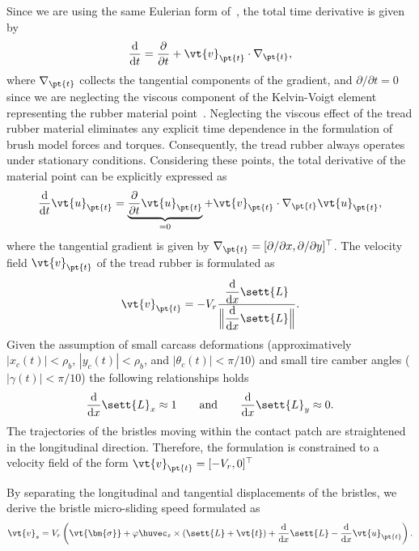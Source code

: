 Since we are using the same Eulerian form of~\cite{romano2022analytical}, the total time derivative is given by
%
\begin{equation}
  \dfrac{\mathrm{d}}{\mathrm{d}t} =  \dfrac{\partial}{\partial t} + \vt{v}_{\pt{t}} \cdot\nabla_{\pt{t}},
\end{equation}
%
where $\nabla_{\pt{t}}$ collects the tangential components of the gradient, and $\partial/\partial t = 0$ since we are neglecting the viscous component of the Kelvin-Voigt element representing the rubber material point~\cite{meyers2008mechanical}. Neglecting the viscous effect of the tread rubber material eliminates any explicit time dependence in the formulation of brush model forces and torques. Consequently, the tread rubber always operates under stationary conditions. Considering these points, the total derivative of the material point can be explicitly expressed as
%
\begin{equation}
  \dfrac{\mathrm{d}}{\mathrm{d}t}\vt{u}_{\pt{t}} = \underbrace{\dfrac{\partial}{\partial t}\vt{u}_{\pt{t}}}_{=0} + \vt{v}_{\pt{t}}\cdot\nabla_{\pt{t}}\vt{u}_{\pt{t}},
\end{equation}
%
where the tangential gradient is given by $\nabla_{\pt{t}} = [\partial/\partial x, \partial/\partial y]^\top$. The velocity field $\vt{v}_{\pt{t}}$ of the tread rubber is formulated as
%
\begin{equation}
  \vt{v}_{\pt{t}} = -V_r \dfrac{\dfrac{\mathrm{d}}{\mathrm{d}x} \sett{L}}{\Big\|\dfrac{\mathrm{d}}{\mathrm{d}x} \sett{L}\Big\|}.
\end{equation}
%
Given the assumption of small carcass deformations (approximatively $|x_c(t)| < \rho_b$, $|y_c(t)| < \rho_b$, and $|\theta_c(t)| < \pi/10$) and small tire camber angles ($|\gamma(t)| < \pi/10$) the following relationships holds~\cite{romano2022advanced}
%
\begin{equation}
  \dfrac{\mathrm{d}}{\mathrm{d}x} \sett{L}_x \approx 1 \qquad \text{and} \qquad \dfrac{\mathrm{d}}{\mathrm{d}x} \sett{L}_y \approx 0.
  \label{chap4:eq:approx}
\end{equation}
%
The trajectories of the bristles moving within the contact patch are straightened in the longitudinal direction. Therefore, the formulation is constrained to a velocity field of the form $\vt{v}_{\pt{t}} = [-V_r, 0]^\top$

By separating the longitudinal and tangential displacements of the bristles, we derive the bristle micro-sliding speed formulated as
%
\begin{equation}
  \vt{v}_s = V_r\left( \vt{\bm{\sigma}} + \varphi\huvec_z \times \left(\sett{L} + \vt{t}\right) + \dfrac{\mathrm{d}}{\mathrm{d}x}\sett{L} - \dfrac{\mathrm{d}}{\mathrm{d}x}\vt{u}_{\pt{t}} \right).
  \label{chap4:eq:v_s_int}
\end{equation}

